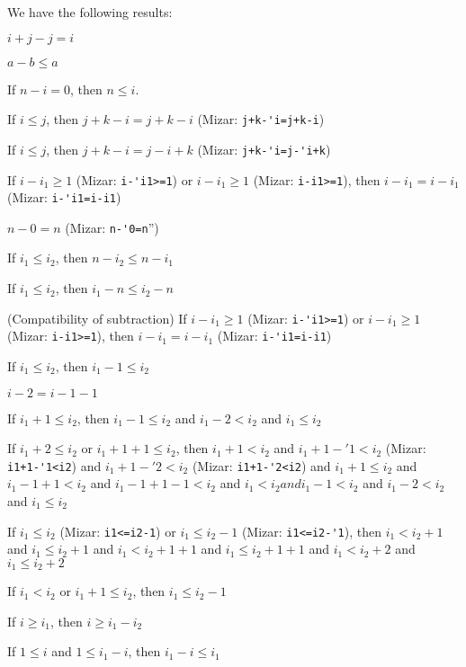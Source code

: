 \documentclass{article}
\begin{document}
We have the following results:
\begin{thm}
\item\label{natd:34} $i+j-j=i$
\item\label{natd:35} $a-b\leq a$
\item\label{natd:36} If $n-i=0$, then $n\leq i$.
\item\label{natd:37} If $i\leq j$, then $j+k-i=j+k-i$ (Mizar: \verb#j+k-'i=j+k-i#)
\item\label{natd:38} If $i\leq j$, then $j+k-i=j-i+k$ (Mizar: \verb#j+k-'i=j-'i+k#)
\item\label{natd:39} If $i-i_{1}\geq1$ (Mizar: \verb#i-'i1>=1#) or
  $i-i_{1}\geq1$ (Mizar: \verb#i-i1>=1#), then $i-i_{1}=i-i_{1}$ (Mizar: \verb#i-'i1=i-i1#)
\item\label{natd:40} $n-0=n$ (Mizar: \verb#n-'0=n#'')
\item\label{natd:41} If $i_{1}\leq i_{2}$, then $n-i_{2}\leq n-i_{1}$
\item\label{natd:42} If $i_{1}\leq i_{2}$, then $i_{1}-n\leq i_{2}-n$
\item\label{natd:43} (Compatibility of subtraction)
  If $i-i_{1}\geq1$ (Mizar: \verb#i-'i1>=1#) or $i-i_{1}\geq1$
  (Mizar: \verb#i-i1>=1#), then $i-i_{1}=i-i_{1}$
  (Mizar: \verb#i-'i1=i-i1#)
\item\label{natd:44} If $i_{1}\leq i_{2}$, then $i_{1}-1\leq i_{2}$
\item\label{natd:45} $i-2=i-1-1$
\item\label{natd:46} If $i_{1}+1\leq i_{2}$, then
  $i_{1}-1\leq i_{2}$ and $i_{1}-2<i_{2}$ and $i_{1}\leq i_{2}$
\item\label{natd:47} If $i_{1}+2\leq i_{2}$ or $i_{1}+1+1\leq i_{2}$,
  then $i_{1}+1<i_{2}$ and $i_{1}+1-'1<i_{2}$ (Mizar: \verb#i1+1-'1<i2#) and
  $i_{1}+1-'2<i_{2}$ (Mizar: \verb#i1+1-'2<i2#)
  and $i_{1}+1\leq i_{2}$ and
  $i_{1}-1+1<i_{2}$ and $i_{1}-1+1-1<i_{2}$ and
  $i_{1}<i_{2} and i_{1}-1<i_{2}$ and
  $i_{1}-2<i_{2}$ and $i_{1}\leq i_{2}$
\item\label{natd:48} If $i_{1}\leq i_{2}$ (Mizar: \verb#i1<=i2-1#) or $i_{1}\leq i_{2}-1$
  (Mizar: \verb#i1<=i2-'1#), then
  $i_{1}<i_{2}+1$ and
  $i_{1}\leq i_{2}+1$ and $i_{1}<i_{2}+1+1$ and
  $i_{1}\leq i_{2}+1+1$ and $i_{1}<i_{2}+2$ and $i_{1}\leq i_{2}+2$
\item\label{natd:49} If $i_{1}<i_{2}$ or $i_{1}+1\leq i_{2}$,
  then $i_{1}\leq i_{2}-1$
\item\label{natd:50} If $i\geq i_{1}$, then $i\geq i_{1}-i_{2}$
\item\label{natd:51} If $1\leq i$ and $1\leq i_{1}-i$, then $i_{1}-i\leq i_{1}$

\end{thm}
\end{document}

